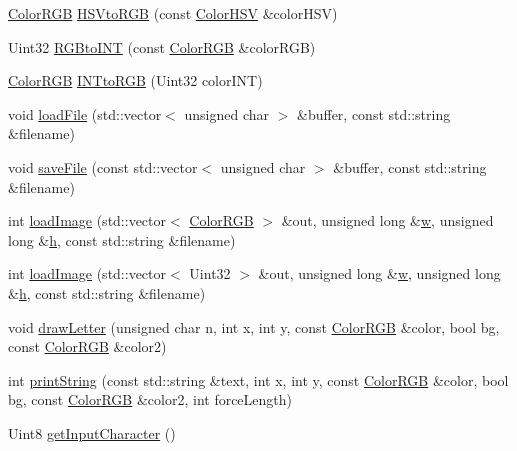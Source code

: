 \begin{DoxyCompactItemize}
\item 
\hyperlink{structQuickCG_1_1ColorRGB}{Color\-R\-G\-B} \hyperlink{namespaceQuickCG_ae04752d2d91945cedd08ed0819c7c601}{H\-S\-Vto\-R\-G\-B} (const \hyperlink{structQuickCG_1_1ColorHSV}{Color\-H\-S\-V} \&color\-H\-S\-V)
\item 
Uint32 \hyperlink{namespaceQuickCG_aed6c6f3c85a31c02ecc08a9c45a93b55}{R\-G\-Bto\-I\-N\-T} (const \hyperlink{structQuickCG_1_1ColorRGB}{Color\-R\-G\-B} \&color\-R\-G\-B)
\item 
\hyperlink{structQuickCG_1_1ColorRGB}{Color\-R\-G\-B} \hyperlink{namespaceQuickCG_aea7f7dab16942a019049d07b66bfadd5}{I\-N\-Tto\-R\-G\-B} (Uint32 color\-I\-N\-T)
\item 
void \hyperlink{namespaceQuickCG_a07d193f2bfde52cf679bb98281f2918c}{load\-File} (std\-::vector$<$ unsigned char $>$ \&buffer, const std\-::string \&filename)
\item 
void \hyperlink{namespaceQuickCG_a90d00feaf86f1886e3a4696851b88078}{save\-File} (const std\-::vector$<$ unsigned char $>$ \&buffer, const std\-::string \&filename)
\item 
int \hyperlink{namespaceQuickCG_a4631b7b1384ebab6765068ab1289e43d}{load\-Image} (std\-::vector$<$ \hyperlink{structQuickCG_1_1ColorRGB}{Color\-R\-G\-B} $>$ \&out, unsigned long \&\hyperlink{namespaceQuickCG_aee0a81fa45305d0058f5270e1acd6356}{w}, unsigned long \&\hyperlink{namespaceQuickCG_ae460032287c9d51b4883aa9a6d7906ab}{h}, const std\-::string \&filename)
\item 
int \hyperlink{namespaceQuickCG_aeb1d2c3be8339130a5e3746bdc4650f4}{load\-Image} (std\-::vector$<$ Uint32 $>$ \&out, unsigned long \&\hyperlink{namespaceQuickCG_aee0a81fa45305d0058f5270e1acd6356}{w}, unsigned long \&\hyperlink{namespaceQuickCG_ae460032287c9d51b4883aa9a6d7906ab}{h}, const std\-::string \&filename)
\item 
void \hyperlink{namespaceQuickCG_a60e0daa6a95f2a5766788557ff11ed34}{draw\-Letter} (unsigned char n, int x, int y, const \hyperlink{structQuickCG_1_1ColorRGB}{Color\-R\-G\-B} \&color, bool bg, const \hyperlink{structQuickCG_1_1ColorRGB}{Color\-R\-G\-B} \&color2)
\item 
int \hyperlink{namespaceQuickCG_a06e4ce5924754ec94c89be69ed2b8806}{print\-String} (const std\-::string \&text, int x, int y, const \hyperlink{structQuickCG_1_1ColorRGB}{Color\-R\-G\-B} \&color, bool bg, const \hyperlink{structQuickCG_1_1ColorRGB}{Color\-R\-G\-B} \&color2, int force\-Length)
\item 
Uint8 \hyperlink{namespaceQuickCG_ac6c5d61da454168eb90504f525e9c038}{get\-Input\-Character} ()

\end{DoxyCompactItemize}
